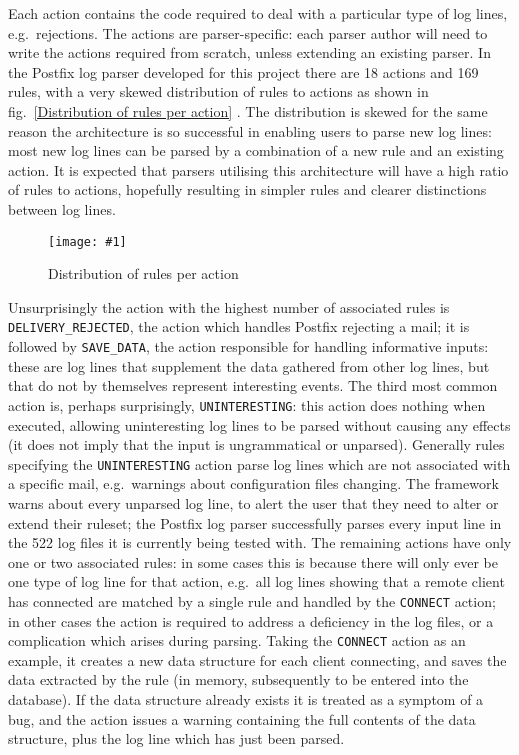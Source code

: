 \documentclass[draft]{svmult}
\newcommand{\showgraph}[3]{%
    \begin{figure}[btp]%
        \caption{#2}\label{#3}%
        \texttt{[image: \#1]}%
    \end{figure}%
}
\newcommand{\refwithlabel}[2]{%
    #1~\vref{#2}%
}
\newcommand{\graphref}[1]{%
    \refwithlabel{fig.}{#1}%
}
\newcommand{\numberOFrules}[0]{%
    169%
}
\newcommand{\numberOFlogFILESall}[0]{%
    522%
}
\newcommand{\numberOFactions}[0]{%
    18%
}
\begin{document}
Each action contains the code required to deal with a particular type of
log lines, e.g.\ rejections.  The actions are parser-specific: each parser
author will need to write the actions required from scratch, unless
extending an existing parser.  In the Postfix log parser developed for this
project there are \numberOFactions{} actions and \numberOFrules{} rules,
with a very skewed distribution of rules to actions as shown in
\graphref{Distribution of rules per action}.  The distribution is skewed
for the same reason the architecture is so successful in enabling users to
parse new log lines: most new log lines can be parsed by a combination of a
new rule and an existing action.  It is expected that parsers utilising
this architecture will have a high ratio of rules to actions, hopefully
resulting in simpler rules and clearer distinctions between log lines.
\showgraph{build/graph-action-distribution}{Distribution of rules per
action}{Distribution of rules per action} Unsurprisingly the action with
the highest number of associated rules is \texttt{DELIVERY\_REJECTED}, the
action which handles Postfix rejecting a mail; it is followed by
\texttt{SAVE\_DATA}, the action responsible for handling informative
inputs: these are log lines that supplement the data gathered from other
log lines, but that do not by themselves represent interesting events.  The
third most common action is, perhaps surprisingly, \texttt{UNINTERESTING}:
this action does nothing when executed, allowing uninteresting log lines to
be parsed without causing any effects (it does not imply that the input is
ungrammatical or unparsed).  Generally rules specifying the
\texttt{UNINTERESTING} action parse log lines which are not associated with
a specific mail, e.g.\ warnings about configuration files changing.  The
framework warns about every unparsed log line, to alert the user that they
need to alter or extend their ruleset; the Postfix log parser successfully
parses every input line in the \numberOFlogFILESall{} log files it is
currently being tested with.  The remaining actions have only one or two
associated rules: in some cases this is because there will only ever be one
type of log line for that action, e.g.\ all log lines showing that a remote
client has connected are matched by a single rule and handled by the
\texttt{CONNECT} action; in other cases the action is required to address a
deficiency in the log files, or a complication which arises during parsing.
Taking the \texttt{CONNECT} action as an example, it creates a new data
structure for each client connecting, and saves the data extracted by the
rule (in memory, subsequently to be entered into the database).  If the
data structure already exists it is treated as a symptom of a bug, and the
action issues a warning containing the full contents of the data structure,
plus the log line which has just been parsed.
\end{document}
